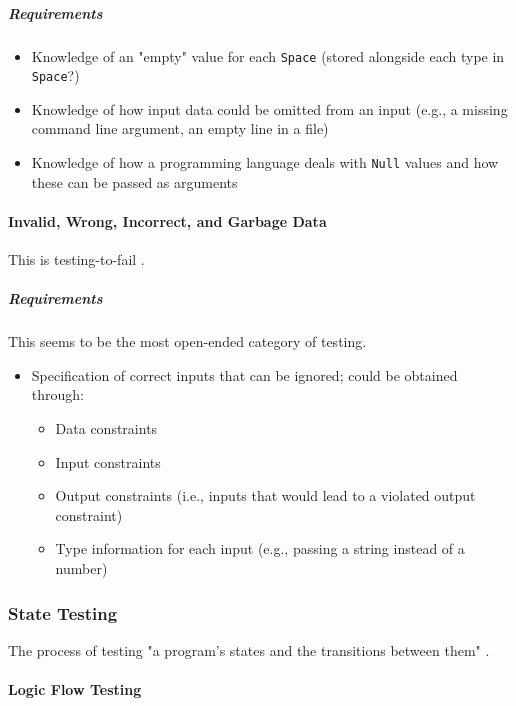 \subparagraph{Requirements}
\begin{itemize}
      \item Knowledge of an "empty" value for each \texttt{Space} (stored
            alongside each type in \texttt{Space}?)
      \item Knowledge of how input data could be omitted from an input
            (e.g., a missing command line argument, an empty line in a file)
      \item Knowledge of how a programming language deals with \texttt{Null}
            values and how these can be passed as arguments
\end{itemize}

\paragraph{Invalid, Wrong, Incorrect, and Garbage Data
      \cite[p.~78-79]{patton_software_2006}}

This is testing-to-fail \cite[p.~77]{patton_software_2006}.

\subparagraph{Requirements}
This seems to be the most open-ended category of testing.
\begin{itemize}
      \item Specification of correct inputs that can be ignored;
            could be obtained through:
            \begin{itemize}
                  \item Data constraints
                  \item Input constraints
                  \item Output constraints (i.e., inputs that would lead to a
                        violated output constraint)
                  \item Type information for each input (e.g., passing a string
                        instead of a number)
            \end{itemize}
\end{itemize}

\subsubsection{State Testing \cite[p.~79-87]{patton_software_2006}}

The process of testing "a program's states and the transitions between them"
\cite[p.~79]{patton_software_2006}.

\paragraph{Logic Flow Testing \cite[p.~80-84]{patton_software_2006}}

